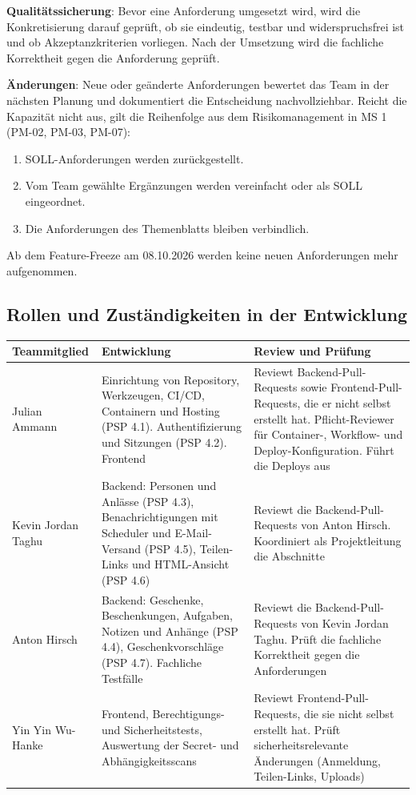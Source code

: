 \documentclass[11pt,a4paper]{article}
\begin{document}
\textbf{Qualitätssicherung}: Bevor eine Anforderung umgesetzt wird, wird die Konkretisierung darauf geprüft, ob sie eindeutig, testbar und widerspruchsfrei ist und ob Akzeptanzkriterien vorliegen. Nach der Umsetzung wird die fachliche Korrektheit gegen die Anforderung geprüft.

\textbf{Änderungen}: Neue oder geänderte Anforderungen bewertet das Team in der nächsten Planung und dokumentiert die Entscheidung nachvollziehbar. Reicht die Kapazität nicht aus, gilt die Reihenfolge aus dem Risikomanagement in MS 1 (PM-02, PM-03, PM-07):

\begin{enumerate}
\item SOLL-Anforderungen werden zurückgestellt.
\item Vom Team gewählte Ergänzungen werden vereinfacht oder als SOLL eingeordnet.
\item Die Anforderungen des Themenblatts bleiben verbindlich.
\end{enumerate}


Ab dem Feature-Freeze am 08.10.2026 werden keine neuen Anforderungen mehr aufgenommen.

\subsection{Rollen und Zuständigkeiten in der Entwicklung}

\begin{tabularx}{\linewidth}{@{}>{\hsize=0.47\hsize\RaggedRight\arraybackslash}X >{\hsize=1.24\hsize\RaggedRight\arraybackslash}X >{\hsize=1.30\hsize\RaggedRight\arraybackslash}X@{}}
\toprule
\textbf{Teammitglied} & \textbf{Entwicklung} & \textbf{Review und Prüfung} \\
\midrule
\endhead
Julian Ammann & Einrichtung von Repository, Werkzeugen, CI/CD, Containern und Hosting (PSP 4.1). Authentifizierung und Sitzungen (PSP 4.2). Frontend & Reviewt Backend-Pull-Requests sowie Frontend-Pull-Requests, die er nicht selbst erstellt hat. Pflicht-Reviewer für Container-, Workflow- und Deploy-Konfiguration. Führt die Deploys aus \\
Kevin Jordan Taghu & Backend: Personen und Anlässe (PSP 4.3), Benachrichtigungen mit Scheduler und E-Mail-Versand (PSP 4.5), Teilen-Links und HTML-Ansicht (PSP 4.6) & Reviewt die Backend-Pull-Requests von Anton Hirsch. Koordiniert als Projektleitung die Abschnitte \\
Anton Hirsch & Backend: Geschenke, Beschenkungen, Aufgaben, Notizen und Anhänge (PSP 4.4), Geschenkvorschläge (PSP 4.7). Fachliche Testfälle & Reviewt die Backend-Pull-Requests von Kevin Jordan Taghu. Prüft die fachliche Korrektheit gegen die Anforderungen \\
Yin Yin Wu-Hanke & Frontend, Berechtigungs- und Sicherheitstests, Auswertung der Secret- und Abhängigkeitsscans & Reviewt Frontend-Pull-Requests, die sie nicht selbst erstellt hat. Prüft sicherheitsrelevante Änderungen (Anmeldung, Teilen-Links, Uploads) \\
\bottomrule
\end{tabularx}
\end{document}
